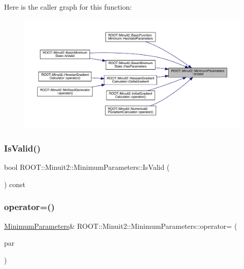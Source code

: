 Here is the caller graph for this function\+:\nopagebreak
\begin{figure}[H]
\begin{center}
\leavevmode
\includegraphics[width=350pt]{db/db8/classROOT_1_1Minuit2_1_1MinimumParameters_a4b30eb313781bc8e344efa322461952a_icgraph}
\end{center}
\end{figure}
\mbox{\label{classROOT_1_1Minuit2_1_1MinimumParameters_a4b30eb313781bc8e344efa322461952a}} 
\subsubsection{\texorpdfstring{IsValid()}{IsValid()}\hspace{0.1cm}{\footnotesize\ttfamily [2/2]}}
{\footnotesize\ttfamily bool R\+O\+O\+T\+::\+Minuit2\+::\+Minimum\+Parameters\+::\+Is\+Valid (\begin{DoxyParamCaption}{ }\end{DoxyParamCaption}) const\hspace{0.3cm}{\ttfamily [inline]}}

\mbox{\label{classROOT_1_1Minuit2_1_1MinimumParameters_a60b35f7b9d6b7e49d2573581a3a9f081}} 
\subsubsection{\texorpdfstring{operator=()}{operator=()}\hspace{0.1cm}{\footnotesize\ttfamily [1/2]}}
{\footnotesize\ttfamily \mbox{\hyperlink{classROOT_1_1Minuit2_1_1MinimumParameters}{Minimum\+Parameters}}\& R\+O\+O\+T\+::\+Minuit2\+::\+Minimum\+Parameters\+::operator= (\begin{DoxyParamCaption}\item[{const \mbox{\hyperlink{classROOT_1_1Minuit2_1_1MinimumParameters}{Minimum\+Parameters}} \&}]{par }\end{DoxyParamCaption})\hspace{0.3cm}{\ttfamily [inline]}}

